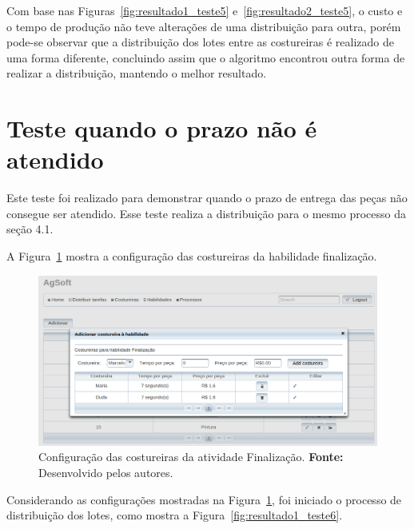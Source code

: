 \par Com base nas Figuras~\ref{fig:resultado1_teste5}
e~\ref{fig:resultado2_teste5}, o custo e o tempo de produção não teve alterações de uma distribuição para outra, porém 
pode-se observar que a distribuição dos lotes entre as costureiras é realizado de uma forma
diferente, concluindo assim que o algoritmo encontrou outra forma de realizar a
distribuição, mantendo o melhor resultado.

\section{Teste quando o prazo não é atendido}

\par Este teste foi realizado para demonstrar quando o prazo de entrega das
peças não consegue ser atendido. Esse teste realiza a distribuição para o mesmo
processo da seção 4.1.

\par A Figura~\ref{fig:configuracao_costureiras_teste6} mostra a configuração
das costureiras da habilidade finalização.

\begin{figure}[h!]
	\centerline{\includegraphics[width=14.7cm]{./imagens/configuracao_costureiras_teste6.png}}
	\caption[Configuração das costureiras da atividade Finalização.] 
	{Configuração das costureiras da atividade Finalização. \textbf{Fonte:} Desenvolvido pelos
	autores.}
	\label{fig:configuracao_costureiras_teste6}
\end{figure}

\par Considerando as configurações mostradas na
Figura~\ref{fig:configuracao_costureiras_teste6}, foi iniciado o processo de
distribuição dos lotes, como mostra a Figura~\ref{fig:resultado1_teste6}.

\newpage

